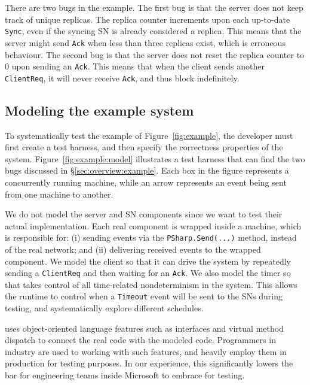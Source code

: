There are two bugs in the example. The first bug is that the server does not keep track of unique replicas. The replica counter increments upon each up-to-date \texttt{Sync}, even if the syncing SN is already considered a replica. This means that the server might send \texttt{Ack} when less than three replicas exist, which is erroneous behaviour. The second bug is that the server does not reset the replica counter to 0 upon sending an \texttt{Ack}. This means that when the client sends another \texttt{ClientReq}, it will never receive \texttt{Ack}, and thus block indefinitely.

\vspace{-1mm}
\subsection{Modeling the example system}
\label{sec:overview:model}

To systematically test the example of Figure~\ref{fig:example}, the developer must first create a \psharp test harness, and then specify the correctness properties of the system. Figure~\ref{fig:example:model} illustrates a test harness that can find the two bugs discussed in \S\ref{sec:overview:example}. Each box in the figure represents a concurrently running \psharp machine, while an arrow represents an event being sent from one machine to another.

We do not model the server and SN components since we want to test their actual implementation. Each real component is wrapped inside a \psharp machine, which is responsible for: (i) sending events via the \texttt{PSharp.Send(...)} method, instead of the real network; and (ii) delivering received events to the wrapped component. We model the client so that it can drive the system by repeatedly sending a \texttt{ClientReq} and then waiting for an \texttt{Ack}. We also model the timer so that \psharp takes control of all time-related nondeterminism in the system. This allows the \psharp runtime to control when a \texttt{Timeout} event will be sent to the SNs during testing, and systematically explore different schedules.

\psharp uses object-oriented language features such as interfaces and virtual method dispatch to connect the real code with the modeled code. Programmers in industry are used to working with such features, and heavily employ them in production for testing purposes. In our experience, this significantly lowers the bar for engineering teams inside Microsoft to embrace \psharp for testing.

